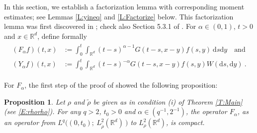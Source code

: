 \documentclass[12pt]{report}
\theoremstyle{plain}
\newtheorem{proposition}[theorem]{Proposition}
\theoremstyle{definition}
\numberwithin{equation}{section}
\newcommand{\R}{\mathbb{R}}
\newcommand{\ud}{\ensuremath{ \mathrm{d} }}
\begin{document}
In this section, we establish a factorization lemma with corresponding moment estimates; see Lemmas
\ref{L:yineq} and \ref{L:Factorize} below. This factorization lemma was first discovered in
\cite{da-prato.kwapien.ea:87:regularity}; check also Section 5.3.1 of
\cite{da-prato.zabczyk:14:stochastic}. For $\alpha\in (0,1)$, $t>0$ and $x\in\R^d$, define formally
\begin{align} \label{E:Ops}
\begin{aligned}
\left(F_{\alpha} f\right)(t,x) & := \int_0^{t} \int_{\R^d} (t-s)^{\alpha-1}G(t-s,x-y)f(s,y)\: \ud s \ud y  \quad \text{and} \\
\left(Y_{\alpha} f\right)(t,x) & := \int_0^{t} \int_{\R^d} (t-s)^{-\alpha }G(t-s,x-y)f(s,y) W(\ud s,\ud y) \:.
\end{aligned}
\end{align}

For $F_\alpha$, the first step of the proof of \cite[Theorem 3.1]{tessitore.zabczyk:98:invariant} showed
the following proposition:
\begin{proposition} \label{P:F-Comp}
	Let $\rho$ and $ \tilde{\rho}$ be given as in condition (i) of Theorem \ref{T:Main} (see
	\eqref{E:rhorho}). For any $q>2$, $t_0>0$ and $\alpha \in (q^{-1},2^{-1})$, the operator
	$F_\alpha$, as an operator from $L^q\big((0,t_0);\: L^2_{\tilde{\rho}}(\R^d)\: \big)$ to
	$L^2_\rho(\R^d)$, is compact.
\end{proposition}
\end{document}
